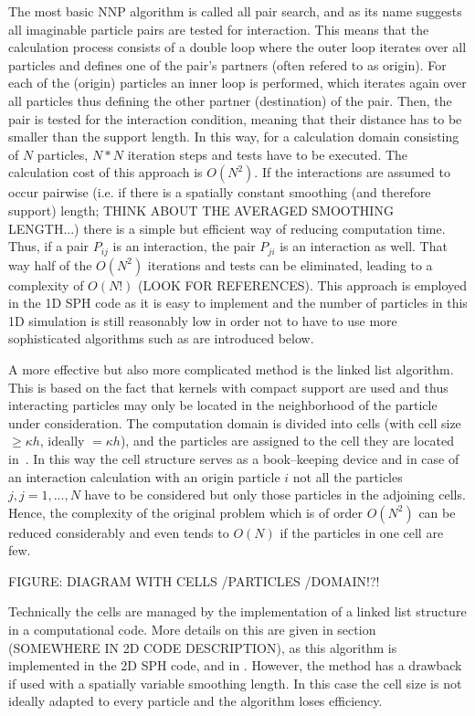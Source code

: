 \documentclass{report}
\begin{document}
The most basic NNP algorithm is called all pair search, and as its name
suggests all imaginable particle pairs are tested for interaction. This means
that the calculation process consists of a double loop where the outer loop
iterates over all particles and defines one of the pair's partners (often
refered to as origin). For each of the (origin) particles an inner loop is
performed, which iterates again over all particles thus defining the other
partner (destination) of the pair. Then, the pair is tested for the
interaction condition, meaning that their distance has to be smaller than the
support length. In this way, for a calculation domain consisting of $N$
particles, $N*N$ iteration steps and tests have to be executed. The
calculation cost of this approach is $O(N^2)$. 
If the
interactions are assumed to occur pairwise (i.e. if there is a spatially constant
smoothing (and therefore support) length; THINK ABOUT THE AVERAGED SMOOTHING
LENGTH...) there is a simple but efficient way of reducing computation
time. Thus, if a pair $P_{ij}$ is an interaction, the pair
$P_{ji}$ is an interaction as well. That way half of the $O(N^2)$ iterations
and tests can be eliminated, leading to a complexity of $O(N!)$ (LOOK FOR
REFERENCES). This approach is employed in the 1D SPH code as it is easy to
implement\cite{Liu2003} and the number of particles in this 1D simulation is
still reasonably low in order not to have to use more sophisticated algorithms
such as are introduced below.

A more effective but also more complicated method is the linked list
algorithm. This is based on the fact that kernels with compact support are
used and thus interacting particles may only be located in the neighborhood of
the particle under consideration. The computation domain is divided into cells (with
cell size$\ge \kappa h$, ideally $=\kappa h$), and the
particles are assigned to the cell they are located in~\cite{Monaghan1983}. In this way the cell
structure serves as a book--keeping device and in case of an interaction
calculation with an origin particle $i$ not all the particles $j,j={1,...,N}$ have
to be considered but only those particles in the adjoining cells. Hence, the
complexity of the original problem which is of order $O(N^2)$ can be reduced
considerably and even tends to $O(N)$ if the particles in one cell are few. 

FIGURE: DIAGRAM WITH CELLS /PARTICLES /DOMAIN!?!

Technically the cells are managed by the implementation of a linked list
structure in a computational code. More details on this are given in section
(SOMEWHERE IN 2D CODE DESCRIPTION), as this algorithm is implemented in the 2D
SPH code, and in \cite{Monaghan1985, Hockney1988}.
However, the method has a drawback if used with a spatially variable smoothing
length. In this case the cell size is not ideally adapted to every particle
and the algorithm loses efficiency.
\end{document}
